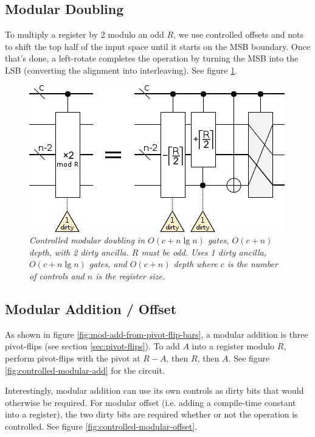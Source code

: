 \documentclass[twocolumn]{article}
\begin{document}
\subsection{Modular Doubling}

To multiply a register by 2 modulo an odd $R$, we use controlled offsets and nots to shift the top half of the input space until it starts on the MSB boundary.
Once that's done, a left-rotate completes the operation by turning the MSB into the LSB (converting the alignment into interleaving).
See figure \ref{fig:modular-double}.

\begin{figure}
  \centering
  \includegraphics[width=\linewidth]{assets/controlled-modular-double.png}
  \caption{\em
    Controlled modular doubling in $O(c + n \lg n)$ gates, $O(c + n)$ depth, with 2 dirty ancilla.
    $R$ must be odd.
    Uses 1 dirty ancilla, $O(c + n \lg n)$ gates, and $O(c + n)$ depth where $c$ is the number of controls and $n$ is the register size.
  }
  \label{fig:modular-double}
\end{figure}


\subsection{Modular Addition / Offset}

As shown in figure \ref{fig:mod-add-from-pivot-flip-bars}, a modular addition is three pivot-flips (see section \ref{sec:pivot-flips}).
To add $A$ into a register modulo $R$, perform pivot-flips with the pivot at $R-A$, then $R$, then $A$.
See figure \ref{fig:controlled-modular-add} for the circuit.

Interestingly, modular addition can use its own controls as dirty bits that would otherwise be required.
For modular offset (i.e. adding a compile-time constant into a register), the two dirty bits are required whether or not the operation is controlled.
See figure \ref{fig:controlled-modular-offset}.
\end{document}
